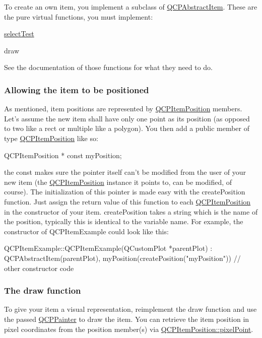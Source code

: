 \-To create an own item, you implement a subclass of \hyperlink{classQCPAbstractItem}{\-Q\-C\-P\-Abstract\-Item}. \-These are the pure virtual functions, you must implement\-: \begin{DoxyItemize}
\item \hyperlink{classQCPAbstractItem_a96d522d10ffc0413b9a366c6f7f0476b}{select\-Test} \item draw\end{DoxyItemize}
\-See the documentation of those functions for what they need to do.\hypertarget{classQCPAbstractItem_items-positioning}{}\subsubsection{\-Allowing the item to be positioned}\label{classQCPAbstractItem_items-positioning}
\-As mentioned, item positions are represented by \hyperlink{classQCPItemPosition}{\-Q\-C\-P\-Item\-Position} members. \-Let's assume the new item shall have only one point as its position (as opposed to two like a rect or multiple like a polygon). \-You then add a public member of type \hyperlink{classQCPItemPosition}{\-Q\-C\-P\-Item\-Position} like so\-:


\begin{DoxyCode}
 QCPItemPosition * const myPosition;
\end{DoxyCode}


the const makes sure the pointer itself can't be modified from the user of your new item (the \hyperlink{classQCPItemPosition}{\-Q\-C\-P\-Item\-Position} instance it points to, can be modified, of course). \-The initialization of this pointer is made easy with the create\-Position function. \-Just assign the return value of this function to each \hyperlink{classQCPItemPosition}{\-Q\-C\-P\-Item\-Position} in the constructor of your item. create\-Position takes a string which is the name of the position, typically this is identical to the variable name. \-For example, the constructor of \-Q\-C\-P\-Item\-Example could look like this\-:


\begin{DoxyCode}
  QCPItemExample::QCPItemExample(QCustomPlot *parentPlot) :
    QCPAbstractItem(parentPlot),
    myPosition(createPosition("myPosition"))
  {
    // other constructor code
  }
\end{DoxyCode}
\hypertarget{classQCPAbstractItem_items-drawing}{}\subsubsection{\-The draw function}\label{classQCPAbstractItem_items-drawing}
\-To give your item a visual representation, reimplement the draw function and use the passed \hyperlink{classQCPPainter}{\-Q\-C\-P\-Painter} to draw the item. \-You can retrieve the item position in pixel coordinates from the position member(s) via \hyperlink{classQCPItemPosition_ae490f9c76ee2ba33752c495d3b6e8fb5}{\-Q\-C\-P\-Item\-Position\-::pixel\-Point}.

